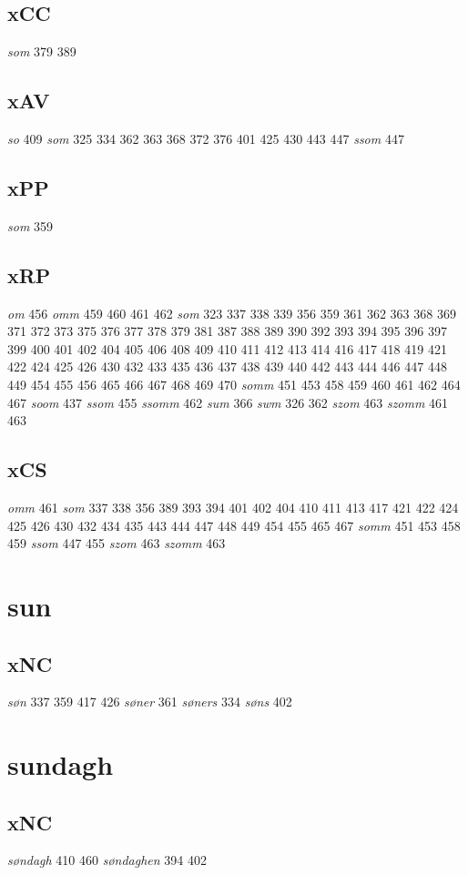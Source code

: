 \documentclass[a4paper,twocolumn]{article}
\begin{document}
\subsection{xCC}
\label{sec:org2a35f72}
\emph{som} 379 389 
\subsection{xAV}
\label{sec:org40bdb03}
\emph{so} 409 \emph{som} 325 334 362 363 368 372 376 401 425 430 443 447 \emph{ssom} 447 
\subsection{xΡP}
\label{sec:org6498954}
\emph{som} 359 
\subsection{xRP}
\label{sec:org93e6317}
\emph{om} 456 \emph{omm} 459 460 461 462 \emph{som} 323 337 338 339 356 359 361 362 363 368 369 371 372 373 375 376 377 378 379 381 387 388 389 390 392 393 394 395 396 397 399 400 401 402 404 405 406 408 409 410 411 412 413 414 416 417 418 419 421 422 424 425 426 430 432 433 435 436 437 438 439 440 442 443 444 446 447 448 449 454 455 456 465 466 467 468 469 470 \emph{somm} 451 453 458 459 460 461 462 464 467 \emph{soom} 437 \emph{ssom} 455 \emph{ssomm} 462 \emph{sum} 366 \emph{swm} 326 362 \emph{szom} 463 \emph{szomm} 461 463 
\subsection{xCS}
\label{sec:org87a73ca}
\emph{omm} 461 \emph{som} 337 338 356 389 393 394 401 402 404 410 411 413 417 421 422 424 425 426 430 432 434 435 443 444 447 448 449 454 455 465 467 \emph{somm} 451 453 458 459 \emph{ssom} 447 455 \emph{szom} 463 \emph{szomm} 463 
\section{sun}
\label{sec:orgab7b1cc}
\subsection{xNC}
\label{sec:org84e1985}
\emph{søn} 337 359 417 426 \emph{søner} 361 \emph{søners} 334 \emph{søns} 402 
\section{sundagh}
\label{sec:org9c90306}
\subsection{xNC}
\label{sec:orgeb81b69}
\emph{søndagh} 410 460 \emph{søndaghen} 394 402 
\end{document}
